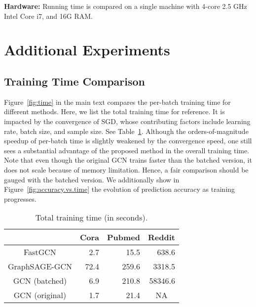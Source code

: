 \documentclass{article} \usepackage{iclr2018_conference,times}
\theoremstyle{plain}\newtheorem{theorem}{Theorem}\theoremstyle{plain}\newtheorem{proposition}[theorem]{Proposition}
\theoremstyle{plain}\newtheorem{corollary}[theorem]{Corollary}
\theoremstyle{plain}\newtheorem{lemma}[theorem]{Lemma}
\begin{document}
{\bf Hardware:}
Running time is compared on a single machine with 4-core 2.5 GHz Intel Core i7, and 16G RAM.




\section{Additional Experiments}

\subsection{Training Time Comparison}
Figure~\ref{fig:time} in the main text compares the per-batch training time for different methods. Here, we list the total training time for reference. It is impacted by the convergence of SGD, whose contributing factors include learning rate, batch size, and sample size. See Table~\ref{tab:total.training.time}. Although the orders-of-magnitude speedup of per-batch time is slightly weakened by the convergence speed, one still sees a substantial advantage of the proposed method in the overall training time. Note that even though the original GCN trains faster than the batched version, it does not scale because of memory limitation. Hence, a fair comparison should be gauged with the batched version. We additionally show in Figure~\ref{fig:accuracy.vs.time} the evolution of prediction accuracy as training progresses.

\begin{table}[ht]
\centering
\caption{Total training time (in seconds).}
\label{tab:total.training.time}
\begin{tabular}{crrr}
\hline
& \multicolumn{1}{c}{Cora} & \multicolumn{1}{c}{Pubmed} & \multicolumn{1}{c}{Reddit}\\
\hline
FastGCN          &  2.7 &  15.5 &   638.6\\
GraphSAGE-GCN    & 72.4 & 259.6 &  3318.5\\
GCN (batched)    &  6.9 & 210.8 & 58346.6\\
GCN (original)   &  1.7 &  21.4 & \multicolumn{1}{c}{NA}\\
\hline
\end{tabular}
\end{table}
\end{document}
